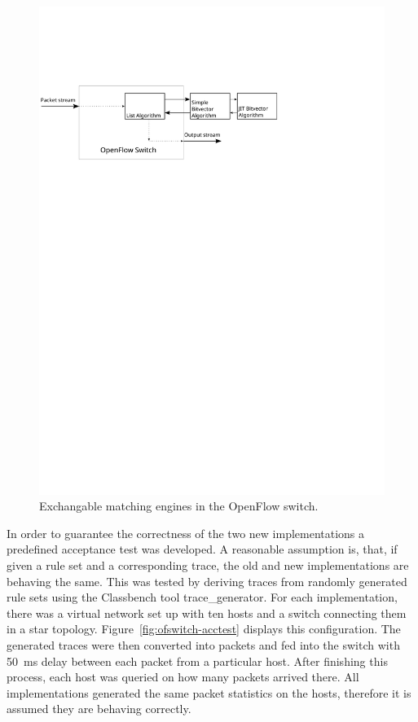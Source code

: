 \documentclass[a4paper,
		12pt,
		parskip=full,
		titlepage
		]{scrartcl}
\begin{document}
\begin{figure}
\centering
\includegraphics[height=0.2\textheight]{images/ofswitch}
\caption{Exchangable matching engines in the OpenFlow switch.}
\label{fig:ofswitch}
\end{figure}

In order to guarantee the correctness of the two new implementations a predefined acceptance test was developed.
A reasonable assumption is, that, if given a rule set and a corresponding trace, 
the old and new implementations are behaving the same.
This was tested by deriving traces from randomly generated rule sets using 
the Classbench\cite{classbench_website} tool \textsf{trace\_generator}.
For each implementation, there was a virtual network set up with ten hosts and a switch connecting them in a star topology.
Figure~\ref{fig:ofswitch-acctest} displays this configuration.
The generated traces were then converted into packets and fed into the switch with 50\ ms delay between each packet from a particular host.
After finishing this process, each host was queried on how many packets arrived there.
All implementations generated the same packet statistics on the hosts, therefore it is assumed they are behaving correctly.
\end{document}
